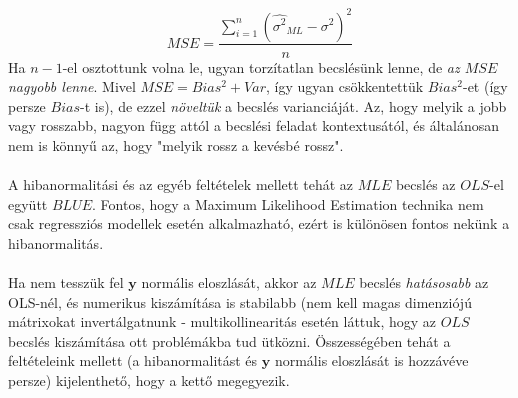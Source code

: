 \documentclass[14p]{report}
\def\pmb{\boldsymbol}
\newcounter{x}
\newcounter{y}
\newcounter{z}
\begin{document}
	\[
		MSE = \frac{\sum_{i=1}^{n}{(\widehat{\sigma^2}_{ML} - \sigma^2)^2}}{n}
	\]
	Ha $n-1$-el osztottunk volna le, ugyan torzítatlan becslésünk lenne, de \emph{az $MSE$ nagyobb lenne}. Mivel $MSE = Bias^2 + Var$, így ugyan csökkentettük $Bias^2$-et (így persze $Bias$-t is), de ezzel \emph{növeltük} a becslés varianciáját. Az, hogy melyik a jobb vagy rosszabb, nagyon függ attól a becslési feladat kontextusától, és általánosan nem is könnyű az, hogy "melyik rossz a kevésbé rossz".  
	\\
	\\
	A hibanormalitási és az egyéb feltételek mellett tehát az $MLE$ becslés az $OLS$-el együtt $BLUE$. Fontos, hogy a Maximum Likelihood Estimation technika nem csak regressziós modellek esetén alkalmazható, ezért is különösen fontos nekünk a hibanormalitás. 
	\\
	\\
	Ha nem tesszük fel $\pmb{y}$ normális eloszlását, akkor az $MLE$ becslés  \emph{hatásosabb} az OLS-nél, és numerikus kiszámítása is stabilabb (nem kell magas dimenziójú mátrixokat invertálgatnunk - multikollinearitás esetén láttuk, hogy az $OLS$ becslés kiszámítása ott problémákba tud ütközni. Összességében tehát a feltételeink mellett (a hibanormalitást és $\pmb{y}$ normális eloszlását is hozzávéve persze) kijelenthető, hogy a kettő megegyezik.
	
\end{document}
